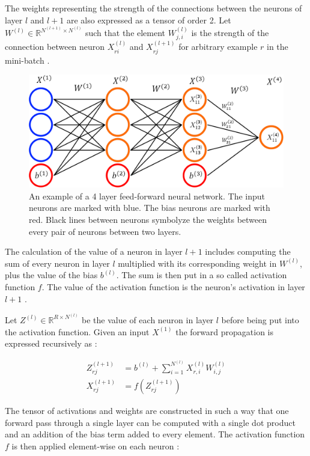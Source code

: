 \documentclass[a4paper, twoside]{article}
\begin{document}
The weights representing the strength of the connections between the neurons of layer $l$ and $l+1$ are also expressed as a tensor of order 2. Let $W^{(l)} \in \mathbb{R}^{N^{(l+1)}  \times N^{(l)}}$ such that the element $W_{j, i}^{(l)}$ is the strength of the connection between neuron $X_{ri}^{(l)}$ and $X_{rj}^{(l+1)}$ for arbitrary example $r$ in the mini-batch \cite{cs231n} \cite{wikiStanford}.

\begin{figure}[h]
	\centering
  		\includegraphics[scale=0.4]{FCC.png}
  	\caption{An example of a 4 layer feed-forward neural network. The input neurons are marked with blue. The bias neurons are marked with red. Black lines between neurons symbolyze the weights between every pair of neurons between two layers.} \label{figFCCmath}
\end{figure}

The calculation of the value of a neuron in layer $l+1$ includes computing the sum of every neuron in layer $l$ multiplied with its corresponding weight in $W^{(l)}$, plus the value of the bias $b^{(l)}$. The sum is then put in a so called activation function $f$. The value of the activation function is the neuron's activation in layer $l+1$ \cite{cs231n} \cite{wikiStanford}.

Let $Z^{(l)} \in \mathbb{R}^{R \times N^{(l)}}$ be the value of each neuron in layer $l$ before being put into the activation function. Given an input $X^{(1)}$ the forward propagation is expressed recursively as \cite{cs231n} \cite{wikiStanford}:

\begin{align}
Z_{rj}^{(l+1)} & = b^{(l)} + \sum^{N^{(l)}}_{i = 1} X^{(l)}_{r,i} W^{(l)}_{i,j}\\
X_{rj}^{(l+1)} & = f(Z_{rj}^{(l+1)})
\end{align}

The tensor of activations and weights are constructed in such a way that one forward pass through a single layer can be computed with a single dot product and an addition of the bias term added to every element. The activation function $f$ is then applied element-wise on each neuron \cite{cs231n} \cite{wikiStanford}:
\end{document}
